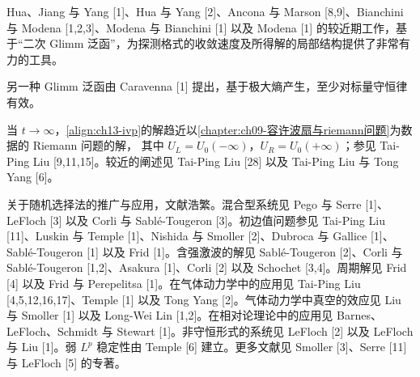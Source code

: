 \documentclass[../../main.tex]{subfiles}
\begin{document}
Hua、Jiang 与 Yang [1]、Hua 与 Yang [2]、Ancona 与 Marson [8,9]、Bianchini 与 Modena [1,2,3]、Modena 与 Bianchini [1] 以及 Modena [1] 的较近期工作，基于``二次 Glimm 泛函''，为探测格式的收敛速度及所得解的局部结构提供了非常有力的工具。

另一种 Glimm 泛函由 Caravenna [1] 提出，基于极大熵产生，至少对标量守恒律有效。

当 $t\to\infty$，\eqref{align:ch13-ivp}的解趋近以\cref{chapter:ch09-容许波扇与riemann问题}为数据的 Riemann 问题的解，
其中 $U_L=U_0(-\infty)$，$U_R=U_0(+\infty)$；参见 Tai-Ping Liu [9,11,15]。较近的阐述见 Tai-Ping Liu [28] 以及 Tai-Ping Liu 与 Tong Yang [6]。

关于随机选择法的推广与应用，文献浩繁。混合型系统见 Pego 与 Serre [1]、LeFloch [3] 以及 Corli 与 Sablé-Tougeron [3]。初边值问题参见 Tai-Ping Liu [11]、Luskin 与 Temple [1]、Nishida 与 Smoller [2]、Dubroca 与 Gallice [1]、Sablé-Tougeron [1] 以及 Frid [1]。含强激波的解见 Sablé-Tougeron [2]、Corli 与 Sablé-Tougeron [1,2]、Asakura [1]、Corli [2] 以及 Schochet [3,4]。周期解见 Frid [4] 以及 Frid 与 Perepelitsa [1]。在气体动力学中的应用见 Tai-Ping Liu [4,5,12,16,17]、Temple [1] 以及 Tong Yang [2]。气体动力学中真空的效应见 Liu 与 Smoller [1] 以及 Long-Wei Lin [1,2]。在相对论理论中的应用见 Barnes、LeFloch、Schmidt 与 Stewart [1]。非守恒形式的系统见 LeFloch [2] 以及 LeFloch 与 Liu [1]。弱 $L^p$ 稳定性由 Temple [6] 建立。更多文献见 Smoller [3]、Serre [11] 与 LeFloch [5] 的专著。
\end{document}
